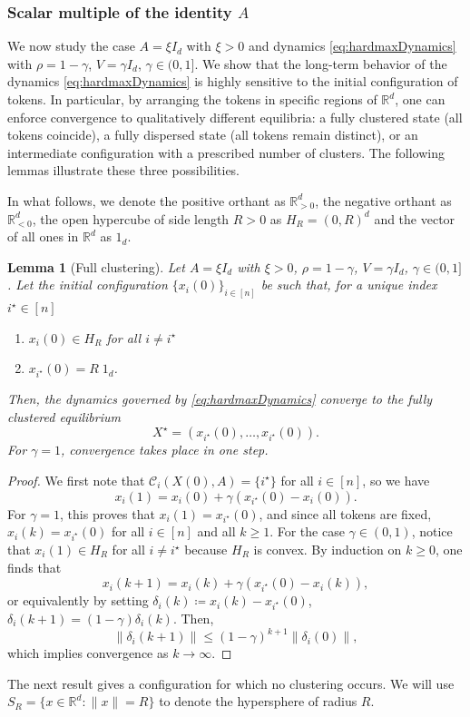 \documentclass[pdflatex,sn-mathphys-num]{sn-jnl}%
\theoremstyle{thmstyleone}%
\newtheorem{lemma}[theorem]{Lemma}
\theoremstyle{thmstyletwo}%
\theoremstyle{thmstylethree}%
\numberwithin{equation}{section}
\newcommand{\R}{\mathbb{R}}
\begin{document}
\subsubsection*{Scalar multiple of the identity $A$}

We now study the case \(A=\xi I_d\) with \(\xi>0\) and dynamics \eqref{eq:hardmaxDynamics} with \(\rho=1-\gamma\), \(V=\gamma I_d\), \(\gamma\in(0,1]\). 
We show that the long-term behavior of the dynamics \eqref{eq:hardmaxDynamics} is highly sensitive to the initial configuration of tokens. 
In particular, by arranging the tokens in specific regions of $\R^d$, one can enforce convergence to qualitatively different equilibria: a fully clustered state (all tokens coincide), a fully dispersed state (all tokens remain distinct), or an intermediate configuration with a prescribed number of clusters. 
The following lemmas illustrate these three possibilities.

In what follows, we denote the positive orthant as $\R_{>0}^d$, the negative orthant as $\R_{<0}^d$, the open hypercube of side length $R>0$ as $H_R = (0,R)^d$ and the vector of all ones in $\R^d$ as $1_d$.

\begin{lemma}[Full clustering]\label{lem:fullConc}
Let $A = \xi I_d$ with $\xi > 0$, \(\rho=1-\gamma\), \(V=\gamma I_d\), $\gamma\in(0,1]$. Let the initial configuration $\{x_i(0)\}_{i\in[n]}$ be such that, for a unique index $i^\star\in [n]$
\begin{enumerate}%
    \item[i)] $x_i(0) \in H_R$ for all $i \neq i^\star$
    \item[ii)] $x_{i^\star}(0) = R \; 1_d$.
\end{enumerate}
Then, the dynamics governed by \eqref{eq:hardmaxDynamics} converge to the fully clustered equilibrium
$$
    X^\star = (x_{i^\star}(0), \dots, x_{i^\star}(0)).
$$
For $\gamma = 1$, convergence takes place in one step.
\end{lemma}
\begin{proof}
We first note that 
$\mathcal{C}_{i}(X(0), A) = \{i^\star\}$ for all $i\in [n]$, so we have
$$
    x_{i}(1) = x_i(0) + \gamma (x_{i^\star}(0) - x_i(0)).
$$
For $\gamma = 1$, this proves that $x_i(1) = x_{i^\star}(0)$, and since all tokens are fixed, $x_i(k) = x_{i^\star}(0)$ for all $i\in [n]$ and all $k\geq 1$. 
For the case $\gamma \in (0,1)$, notice that $x_i(1)\in H_R$ for all $i\neq i^\star$ because $H_R$ is convex. By induction on $k \geq 0$, one finds that
$$
    x_{i}(k+1) = x_i(k) + \gamma (x_{i^\star}(0) - x_i(k)),
$$
or equivalently by setting $\delta_i(k) \coloneqq x_i (k) - x_{i^\star} (0)$, $\delta_{i}(k+1) = (1- \gamma) \delta_i(k)$. Then, 
$$
    \| \delta_i (k+1) \| \leq (1- \gamma)^{k+1} \| \delta_i(0)\|,
$$
which implies convergence as $k\to \infty$.
\end{proof}
%
The next result gives a configuration for which no clustering occurs. We will use $S_R = \{x \in \R^d : \|x\| = R\}$ to denote the hypersphere of radius $R$.
\end{document}
